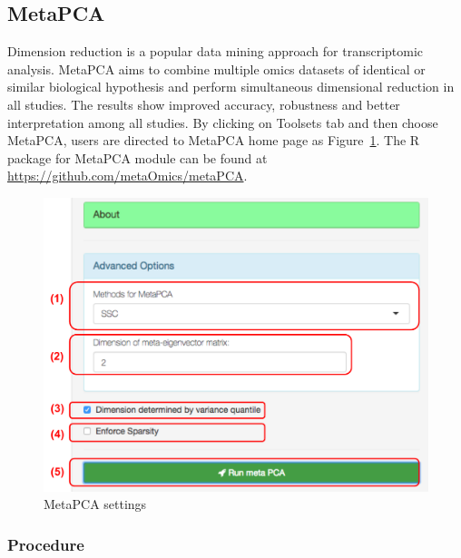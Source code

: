 \subsection{MetaPCA}
Dimension reduction is a popular data mining approach for transcriptomic analysis.
MetaPCA aims to combine multiple omics datasets of identical or similar biological hypothesis and perform simultaneous dimensional reduction in all studies.
The results show improved accuracy, robustness and better interpretation among all studies.
By clicking on Toolsets tab and then choose MetaPCA,
users are directed to MetaPCA home page as Figure~\ref{fig:metaPCAHome}.
The R package for MetaPCA module can be found at \url{https://github.com/metaOmics/metaPCA}.

\begin{figure}[H]
\begin{center}
\includegraphics[scale=0.4]{./figure/metaPCA/metaPCAHome.pdf}
\caption{MetaPCA settings}
\label{fig:metaPCAHome}
\end{center}
\end{figure}

\subsubsection{Procedure}

